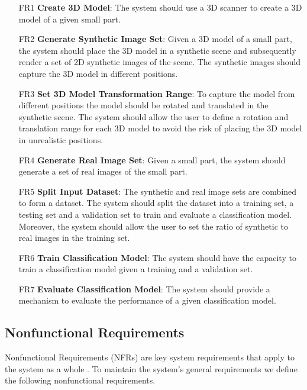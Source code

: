 \begin{itemize}
  \item [FR1] \textbf{Create 3D Model}: The system should use a 3D scanner to create a 3D model of a given small part.

  \item [FR2] \textbf{Generate Synthetic Image Set}: Given a 3D model of a small part, the system should place the 3D model in a synthetic scene and subsequently render a set of 2D synthetic images of the scene. The synthetic images should capture the 3D model in different positions.

  \item [FR3] \textbf{Set 3D Model Transformation Range}: To capture the model from different positions the model should be rotated and translated in the synthetic scene. The system should allow the user to define a rotation and translation range for each 3D model to avoid the risk of placing the 3D model in unrealistic positions.

  \item [FR4] \textbf{Generate Real Image Set}: Given a small part, the system should generate a set of real images of the small part.

  \item [FR5] \textbf{Split Input Dataset}: The synthetic and real image sets are combined to form a dataset. The system should split the dataset into a training set, a testing set and a validation set to train and evaluate a classification model. Moreover, the system should allow the user to set the ratio of synthetic to real images in the training set.

  \item [FR6] \textbf{Train Classification Model}: The system should have the capacity to train a classification model given a training and a validation set.

  \item [FR7] \textbf{Evaluate Classification Model}: The system should provide a mechanism to evaluate the performance of a given classification model.
\end{itemize}

\subsection{Nonfunctional Requirements}
Nonfunctional Requirements (NFRs) are key system requirements that apply to the system as a whole \cite{bruegge2004object}. To maintain the system's general requirements we define the following nonfunctional requirements.

